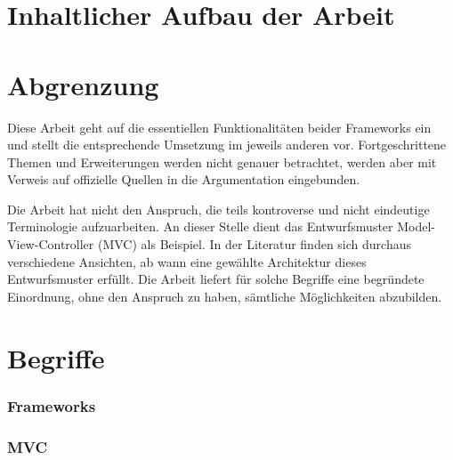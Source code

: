 \section{Inhaltlicher Aufbau der Arbeit}

\section{Abgrenzung}

Diese Arbeit geht auf die essentiellen Funktionalitäten beider Frameworks ein und stellt die entsprechende Umsetzung im jeweils
anderen vor. Fortgeschrittene Themen und Erweiterungen werden nicht genauer betrachtet, werden aber mit Verweis auf offizielle Quellen
in die Argumentation eingebunden.

Die Arbeit hat nicht den Anspruch, die teils kontroverse und nicht eindeutige Terminologie aufzuarbeiten. An dieser Stelle dient das Entwurfsmuster Model-View-Controller (MVC) als Beispiel. In der Literatur finden sich durchaus verschiedene Ansichten, ab wann eine gewählte Architektur dieses Entwurfsmuster erfüllt. Die Arbeit liefert für solche Begriffe eine begründete Einordnung, ohne den Anspruch zu haben, sämtliche Möglichkeiten abzubilden.

\section{Begriffe}
\subsubsection{Frameworks}
\subsubsection{MVC}